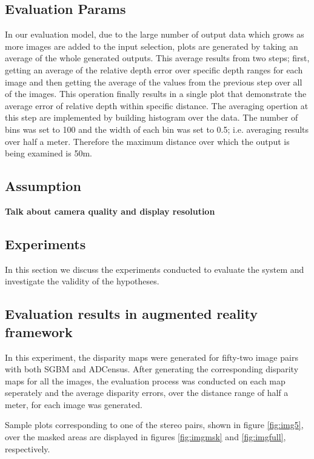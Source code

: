 \subsection{Evaluation Params}
In our evaluation model, due to the large number of output data which grows as more images are added to the input selection, 
plots are generated by taking an average of the whole generated outputs. This average results from two steps; first, getting an average of the relative depth error over specific
depth ranges for each image and then getting the average of the values from the previous step over all of the images. This operation finally results in a single plot
that demonstrate the average error of relative depth within specific distance.
The averaging opertion at this step are implemented by building histogram over the data. The number of bins was set to 100 and the width of each bin was set to 0.5; 
i.e. averaging results over half a meter. Therefore the maximum distance over which the output is being examined is 50m.

\subsection{Assumption}
\textbf{Talk about camera quality and display resolution}

\subsection{Experiments}
In this section we discuss the experiments conducted to evaluate the system and investigate the validity of the hypotheses.

\subsection{Evaluation results in augmented reality framework}

In this experiment, the disparity maps 
were generated for fifty-two image pairs with both SGBM and ADCensus. 
After generating the corresponding disparity maps for all the images, 
the evaluation process was conducted on each map seperately and the average disparity errors, over the distance range of half a meter,
for each image was generated.

Sample plots corresponding to one of the stereo pairs, shown in figure \ref{fig:img5},
over the masked areas are displayed in figures \ref{fig:imgmsk} and \ref{fig:imgfull}, respectively.

